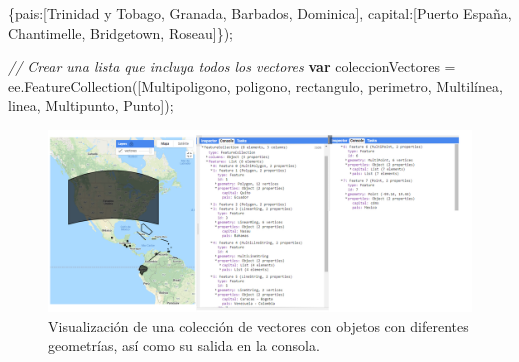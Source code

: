 \documentclass[
  12pt,
  letterpaper,
  twoside]{book}
\newenvironment{Shaded}{\begin{snugshade}}{\end{snugshade}}
\newcommand{\CommentTok}[1]{\textcolor[rgb]{0.24,0.58,0.00}{\textit{#1}}}
\newcommand{\DataTypeTok}[1]{\textcolor[rgb]{0.00,0.00,0.00}{#1}}
\newcommand{\FunctionTok}[1]{\textcolor[rgb]{0.48,0.12,0.64}{#1}}
\newcommand{\KeywordTok}[1]{\textcolor[rgb]{0.00,0.00,0.00}{\textbf{#1}}}
\newcommand{\NormalTok}[1]{#1}
\newcommand{\OperatorTok}[1]{\textcolor[rgb]{0.00,0.00,0.00}{#1}}
\newcommand{\StringTok}[1]{\textcolor[rgb]{0.87,0.29,0.22}{#1}}
\begin{document}
\begin{Shaded}
\begin{Highlighting}[]
\NormalTok{                  \{}\DataTypeTok{pais}\OperatorTok{:}\NormalTok{[}\StringTok{\textquotesingle{}Trinidad y Tobago\textquotesingle{}}\OperatorTok{,}
                    \StringTok{\textquotesingle{}Granada\textquotesingle{}}\OperatorTok{,}
                    \StringTok{\textquotesingle{}Barbados\textquotesingle{}}\OperatorTok{,}
                    \StringTok{\textquotesingle{}Dominica\textquotesingle{}}\NormalTok{]}\OperatorTok{,}
                  \DataTypeTok{capital}\OperatorTok{:}\NormalTok{[}\StringTok{\textquotesingle{}Puerto España\textquotesingle{}}\OperatorTok{,}
                    \StringTok{\textquotesingle{}Chantimelle\textquotesingle{}}\OperatorTok{,}
                    \StringTok{\textquotesingle{}Bridgetown\textquotesingle{}}\OperatorTok{,}
                    \StringTok{\textquotesingle{}Roseau\textquotesingle{}}\NormalTok{]\})}\OperatorTok{;}
\end{Highlighting}
\end{Shaded}

\begin{Shaded}
\begin{Highlighting}[]
\CommentTok{// Crear una lista que incluya todos los vectores}
\KeywordTok{var}\NormalTok{ coleccionVectores }\OperatorTok{=}\NormalTok{ ee}\OperatorTok{.}\FunctionTok{FeatureCollection}\NormalTok{([Multipoligono}\OperatorTok{,}
\NormalTok{  poligono}\OperatorTok{,}
\NormalTok{  rectangulo}\OperatorTok{,}
\NormalTok{  perimetro}\OperatorTok{,}
\NormalTok{  Multilínea}\OperatorTok{,}
\NormalTok{  linea}\OperatorTok{,}
\NormalTok{  Multipunto}\OperatorTok{,}
\NormalTok{  Punto])}\OperatorTok{;}
\end{Highlighting}
\end{Shaded}

\begin{figure}[H]

{\centering \includegraphics[width=0.95\linewidth]{Img/ej16} 

}

\caption{Visualización de una colección de vectores con objetos con diferentes geometrías, así como su salida en la consola.}\label{fig:f84}
\end{figure}
\end{document}
